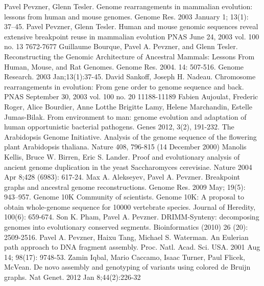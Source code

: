 \documentclass[a4paper, 12pt]{scrartcl}
\begin{document}
\begin{thebibliography}{99}
	Pavel Pevzner, Glenn Tesler.
	Genome rearrangements in mammalian evolution: lessons from human and mouse genomes.
	Genome Res. 2003 January 1; 13(1): 37–45.
	Pavel Pevzner, Glenn Tesler.
	Human and mouse genomic sequences reveal extensive breakpoint reuse in mammalian evolution
	PNAS June 24, 2003  vol. 100  no. 13  7672-7677
	Guillaume Bourque, Pavel A. Pevzner, and Glenn Tesler.
	Reconstructing the Genomic Architecture of Ancestral Mammals: Lessons From Human, Mouse, and Rat Genomes.
	Genome Res. 2004.  14:  507-516.
	Genome Research. 2003 Jan;13(1):37-45.
	David Sankoff, Joseph H. Nadeau.
	Chromosome rearrangements in evolution: From gene order to genome sequence and back.
	PNAS September 30, 2003  vol. 100  no. 20  11188-11189
	Fabien Aujoulat, Frederic Roger, Alice Bourdier, Anne Lotthe  Brigitte Lamy, Helene Marchandin, Estelle Jumas-Bilak.
	From environment to man: genome evolution and adaptation of human opportunistic bacterial pathogens.
	Genes 2012, 3(2), 191-232.
	The Arabidopsis Genome Initiative.
	Analysis of the genome sequence of the flowering plant Arabidopsis thaliana.
	Nature 408, 796-815 (14 December 2000)
	Manolis Kellis, Bruce W. Birren, Eric S. Lander.
	Proof and evolutionary analysis of ancient genome duplication in the yeast Saccharomyces cerevisiae.
	Nature 2004 Apr 8;428 (6983): 617-24.
	Max A. Alekseyev, Pavel A. Pevzner.
	Breakpoint graphs and ancestral genome reconstructions.
	Genome Res. 2009 May; 19(5): 943–957.
	Genome 10K Community of scientists.
	Genome 10K: A proposal to obtain whole-genome sequence for 10000 vertebrate species.
	Journal of Heredity, 100(6): 659-674.
	Son K. Pham, Pavel A. Pevzner.
	DRIMM-Synteny: decomposing genomes into evolutionary conserved segments.
	Bioinformatics (2010)  26  (20):  2509-2516.
	Pavel A. Pevzner, Haixu Tang, Michael S. Waterman.
	An Eulerian path approach to DNA fragment assembly.
	Proc. Natl. Acad. Sci. USA. 2001 Aug 14; 98(17): 9748-53.
	Zamin Iqbal, Mario Caccamo, Isaac Turner, Paul Flicek, McVean.
	De novo assembly and genotyping of variants using colored de Bruijn graphs.
	Nat Genet. 2012 Jan 8;44(2):226-32
\end{thebibliography}
\end{document}
